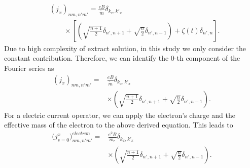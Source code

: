 \documentclass[
 reprint,
 amsmath,amssymb,
 aps,
 prb,
]{revtex4-2}
\begin{document}
\begin{appendix}
\begin{equation}
  \begin{aligned}
    &\left({j}_x \right)_{nm,n'm'} =
    \frac{eB}{{\widetilde{m}}}
    \delta_{k_x,k'_x} \\
    & \qquad\times
    \left[
    \left(\sqrt{\frac{n+1}{2}} \delta_{n',n+1} + \sqrt{\frac{n}{2}}
    \delta_{n',n-1}\right)
    + \zeta(t) \delta_{n',n}
    \right].
  \end{aligned}
\end{equation}
Due to high complexity of extract solution, in this study we only consider the constant contribution. Therefore, we can identify the $0$-th component of the Fourier series as
\begin{equation} \label{eq:d10}
  \begin{aligned}
      \left({j}_x \right)_{nm,n'm'} =&
      \frac{eB}{\widetilde{m}}
      \delta_{k_x,k'_x} \\
      & \times
      \left(\sqrt{\frac{n+1}{2}} \delta_{n',n+1} + \sqrt{\frac{n}{2}}
      \delta_{n',n-1} \right).
  \end{aligned}
\end{equation}
For a electric current operator, we can apply the electron's charge and the  effective mass of the electron to the above derived equation. This leads to
\begin{equation} \label{eq:d11}
  \begin{aligned}
      \Big({j}^x_{s=0}\Big)_{nm,n'm'}^{electron}  =&
      \frac{e^2B}{{m_e}}
      \delta_{k_x,k'_x}\\
      & \times
      \left(\sqrt{\frac{n+1}{2}} \delta_{n',n+1} + \sqrt{\frac{n}{2}}
      \delta_{n',n-1} \right).
  \end{aligned}
\end{equation}


\end{appendix}
\end{document}
